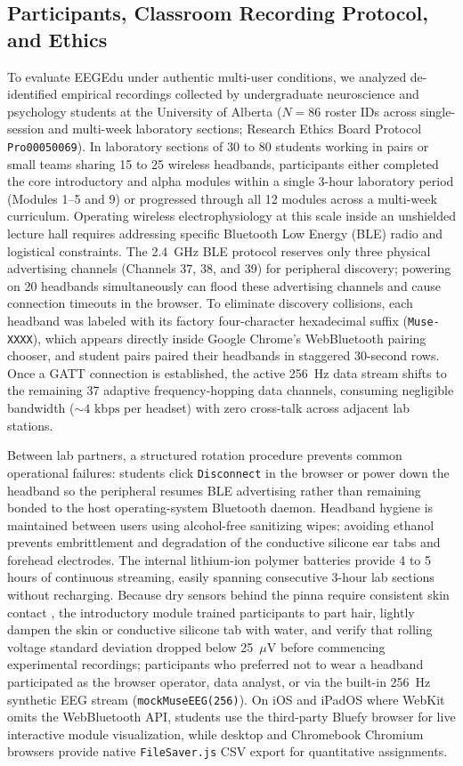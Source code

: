 \documentclass[11pt,letterpaper]{article}
\providecommand{\NRoster}{86}
\begin{document}
\subsection{Participants, Classroom Recording Protocol, and Ethics}
To evaluate EEGEdu under authentic multi-user conditions, we analyzed de-identified empirical recordings collected by undergraduate neuroscience and psychology students at the University of Alberta ($N = \NRoster$ roster IDs across single-session and multi-week laboratory sections; Research Ethics Board Protocol \texttt{Pro00050069}). In laboratory sections of 30 to 80 students working in pairs or small teams sharing 15 to 25 wireless headbands, participants either completed the core introductory and alpha modules within a single 3-hour laboratory period (Modules 1--5 and 9) or progressed through all 12 modules across a multi-week curriculum. Operating wireless electrophysiology at this scale inside an unshielded lecture hall requires addressing specific Bluetooth Low Energy (BLE) radio and logistical constraints. The 2.4~GHz BLE protocol reserves only three physical advertising channels (Channels 37, 38, and 39) for peripheral discovery; powering on 20 headbands simultaneously can flood these advertising channels and cause connection timeouts in the browser. To eliminate discovery collisions, each headband was labeled with its factory four-character hexadecimal suffix (\texttt{Muse-XXXX}), which appears directly inside Google Chrome's WebBluetooth pairing chooser, and student pairs paired their headbands in staggered 30-second rows. Once a GATT connection is established, the active 256~Hz data stream shifts to the remaining 37 adaptive frequency-hopping data channels, consuming negligible bandwidth ($\sim 4\text{ kbps}$ per headset) with zero cross-talk across adjacent lab stations.

Between lab partners, a structured rotation procedure prevents common operational failures: students click \texttt{Disconnect} in the browser or power down the headband so the peripheral resumes BLE advertising rather than remaining bonded to the host operating-system Bluetooth daemon. Headband hygiene is maintained between users using alcohol-free sanitizing wipes; avoiding ethanol prevents embrittlement and degradation of the conductive silicone ear tabs and forehead electrodes. The internal lithium-ion polymer batteries provide 4 to 5 hours of continuous streaming, easily spanning consecutive 3-hour lab sections without recharging. Because dry sensors behind the pinna require consistent skin contact \citep[\texttt{TP9/TP10};][]{mathewson2017high}, the introductory module trained participants to part hair, lightly dampen the skin or conductive silicone tab with water, and verify that rolling voltage standard deviation dropped below 25~$\mu\text{V}$ before commencing experimental recordings; participants who preferred not to wear a headband participated as the browser operator, data analyst, or via the built-in 256~Hz synthetic EEG stream (\texttt{mockMuseEEG(256)}). On iOS and iPadOS where WebKit omits the WebBluetooth API, students use the third-party Bluefy browser for live interactive module visualization, while desktop and Chromebook Chromium browsers provide native \texttt{FileSaver.js} CSV export for quantitative assignments.
\end{document}
